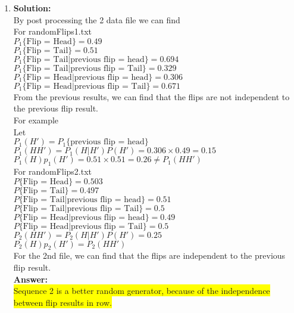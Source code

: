 \documentclass{article}
\newcommand{\myansw}{\textbf{Answer:}\\}
\newcommand{\mysolu}{\textbf{Solution:}\\}
\begin{document}
\begin{enumerate}
\begin{enumerate}
	\end{enumerate}
	\item
	\mysolu
	By post processing the 2 data file we can find\\
	For randomFlips1.txt\\
	${P_1\{\text{Flip = Head}\} = 0.49 }$\\
	${P_1\{\text{Flip = Tail}\} = 0.51 }$\\
	${P_1\{\text{Flip = Tail|previous flip = head}\} = 0.694 }$\\
	${P_1\{\text{Flip = Tail|previous flip = Tail}\} = 0.329 }$\\
	${P_1\{\text{Flip = Head|previous flip = head}\} = 0.306 }$\\
	${P_1\{\text{Flip = Head|previous flip = Tail}\} = 0.671 }$\\

	From the previous results, we can find that the flips are not independent to the previous flip result.\\
	For example\\
	Let\\
	$P_1(H') = P_1\{\text{previous flip = head}\}$\\
	$P_1(HH') = P_1(H|H')P(H') = 0.306 \times 0.49 = 0.15$\\
	$P_1(H)p_1(H') = 0.51 \times 0.51 = 0.26  \neq P_1(HH')$\\
	For randomFlips2.txt\\
	${P\{\text{Flip = Head}\} = 0.503 }$\\
	${P\{\text{Flip = Tail}\} = 0.497 }$\\
	${P\{\text{Flip = Tail|previous flip = head}\} = 0.51 }$\\
	${P\{\text{Flip = Tail|previous flip = Tail}\} = 0.5 }$\\
	${P\{\text{Flip = Head|previous flip = head}\} = 0.49 }$\\
	${P\{\text{Flip = Head|previous flip = Tail}\} = 0.5 }$\\
	$P_2(HH') = P_2(H|H')P(H') = 0.25$\\
	$P_2(H)p_2(H') =  P_2(HH')$\\
	For the 2nd file, we can find that the flips are independent to the previous flip result.\\
	\myansw
	\colorbox{yellow}{Sequence 2 is a better random generator, because of the independence between flip results in row.}\\
	

\end{enumerate}
\end{document}
